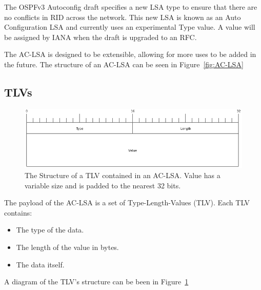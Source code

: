 The OSPFv3 Autoconfig draft specifies a new LSA type to ensure that
there are no conflicts in RID across the network. This new LSA is known
as an Auto Configuration LSA and currently uses an experimental Type value. A
value will be assigned by IANA when the draft is upgraded to an RFC. 

The AC-LSA is designed to be extensible, allowing for more uses to be added in
the future. The structure of an AC-LSA can be seen in Figure~\ref{fig:AC-LSA} 

\subsection{TLVs}
\begin{figure}
\begin{center}
	\includegraphics[width=\linewidth]{../Diagrams/Packets/tlv.png}
	\caption{The Structure of a TLV contained in an AC-LSA\@. Value has a variable
	size and is padded to the nearest 32 bits.}\label{fig:TLV}
\end{center}
\end{figure}

The payload of the AC-LSA is a set of Type-Length-Values (TLV). Each TLV
contains: 
\begin{itemize}
    \item The type of the data.
    \item The length of the value in bytes.
    \item The data itself.
  \end{itemize}

A diagram of the TLV's structure can be been in Figure~\ref{fig:TLV}

